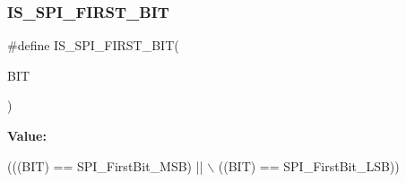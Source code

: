 \subsubsection{\texorpdfstring{I\+S\+\_\+\+S\+P\+I\+\_\+\+F\+I\+R\+S\+T\+\_\+\+B\+IT}{IS\_SPI\_FIRST\_BIT}}
{\footnotesize\ttfamily \#define I\+S\+\_\+\+S\+P\+I\+\_\+\+F\+I\+R\+S\+T\+\_\+\+B\+IT(\begin{DoxyParamCaption}\item[{}]{B\+IT }\end{DoxyParamCaption})}

{\bfseries Value\+:}
\begin{DoxyCode}
(((BIT) == SPI\_FirstBit\_MSB) || \(\backslash\)
                               ((BIT) == SPI\_FirstBit\_LSB))
\end{DoxyCode}
